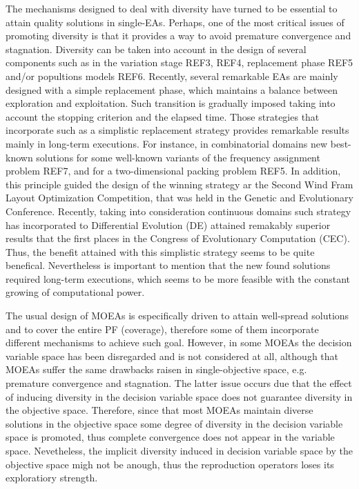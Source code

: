 The mechanisms designed to deal with diversity have turned to be essential to attain quality solutions in single-EAs.
%
Perhaps, one of the most critical issues of promoting diversity is that it provides a way to avoid premature convergence and stagnation.
%
Diversity can be taken into account in the design of several components such as in the variation stage REF3, REF4, replacement phase REF5 and/or popultions models REF6.
%
Recently, several remarkable EAs are mainly designed with a simple replacement phase, which maintains a balance between exploration and exploitation.
%
Such transition is gradually imposed taking into account the stopping criterion and the elapsed time.
%
Those strategies that incorporate such as a simplistic replacement strategy provides remarkable results mainly in long-term executions.
%
For instance, in combinatorial domains new best-known solutions for some well-known variants of the frequency assignment problem REF7, and for a two-dimensional packing problem REF5.
%
In addition, this principle guided the design of the winning strategy ar the Second Wind Fram Layout Optimization Competition, that was held in the Genetic and Evolutionary Conference.
%
Recently, taking into consideration continuous domains such strategy has incorporated to Differential Evolution (DE) attained remakably superior results that the first places in the Congress of Evolutionary Computation (CEC).
%
Thus, the benefit attained with this simplistic strategy seems to be quite benefical.
%
Nevertheless is important to mention that the new found solutions required long-term executions, which seems to be more feasible with the constant growing of computational power.
%

The usual design of MOEAs is especifically driven to attain well-spread solutions and to cover the entire PF (coverage), therefore some of them incorporate different mechanisms to achieve such goal.
%
However, in some MOEAs the decision variable space has been disregarded and is not considered at all, although that MOEAs suffer the same drawbacks raisen in single-objective space, e.g. premature convergence and stagnation.
%
The latter issue occurs due that the effect of inducing diversity in the decision variable space does not guarantee diversity in the objective space.
%
Therefore, since that most MOEAs maintain diverse solutions in the objective space some degree of diversity in the decision variable space is promoted, thus complete convergence does not appear in the variable space.
%
Nevetheless, the implicit diversity induced in decision variable space by the objective space migh not be anough, thus the reproduction operators loses its exploratiory strength.
%

